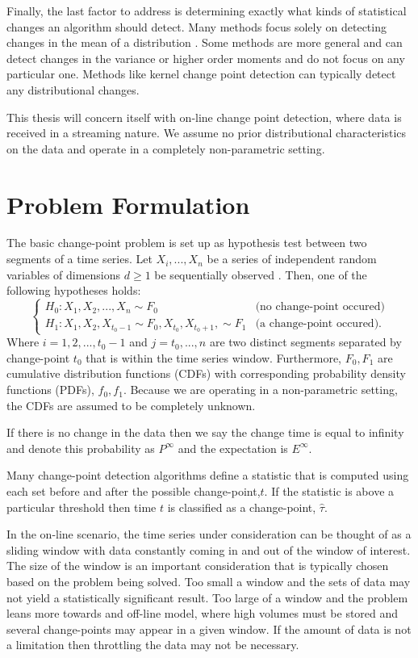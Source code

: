 Finally, the last factor to address is determining exactly what kinds of statistical changes an algorithm should detect. Many methods focus solely on detecting changes in the mean of a distribution \cite{lee2010change}. Some methods are more general and can detect changes in the variance or higher order moments and do not focus on any particular one. Methods like kernel change point detection can typically detect any distributional changes. 

This thesis will concern itself with on-line change point detection, where data is received in a streaming nature. We assume no prior distributional characteristics on the data and operate in a completely non-parametric setting. 

\section{Problem Formulation}
The basic change-point problem is set up as hypothesis test between two segments of a time series. Let $X_i,...,X_n$ be a series of independent random variables of dimensions $d \geq 1$ be sequentially observed . Then, one of the following hypotheses holds:
\begin{equation}
  \begin{cases}
    H_0: X_1, X_2, ...,X_n \sim  F_0 & \text{(no change-point occured)} \\
    H_1: X_1,X_2, X_{t_0-1} \sim F_0, X_{t_0}, X_{t_0+1},  \sim F_1 & \text{(a change-point occured)}. 
  \end{cases}
\end{equation}
Where $i=1,2,...,t_0-1$ and $j=t_0,...,n$  are two distinct segments separated by change-point $t_0$ that is within the time series window. Furthermore, $F_0, F_1$ are cumulative distribution functions (CDFs) with corresponding probability density functions (PDFs), $f_0, f_1$. Because we are operating in a non-parametric setting, the CDFs are assumed to be completely unknown. 

If there is no change in the data then we say the change time is equal to infinity and denote this probability as $P^{\infty}$ and the expectation is $E^{\infty}$.

Many change-point detection algorithms define a statistic that is computed using each set before and after the possible change-point,$t$. If the statistic is above a particular threshold then time $t$ is classified as a change-point, $\hat{\tau}$.

In the on-line scenario, the time series under consideration can be thought of as a sliding window with data constantly coming in and out of the window of interest. The size of the window is an important consideration that is typically chosen based on the problem being solved. Too small a window and the sets of data may not yield a statistically significant result. Too large of a window and the problem leans more towards and off-line model, where high volumes must be stored and several change-points may appear in a given window. If the amount of data is not a limitation then throttling the data may not be necessary.

